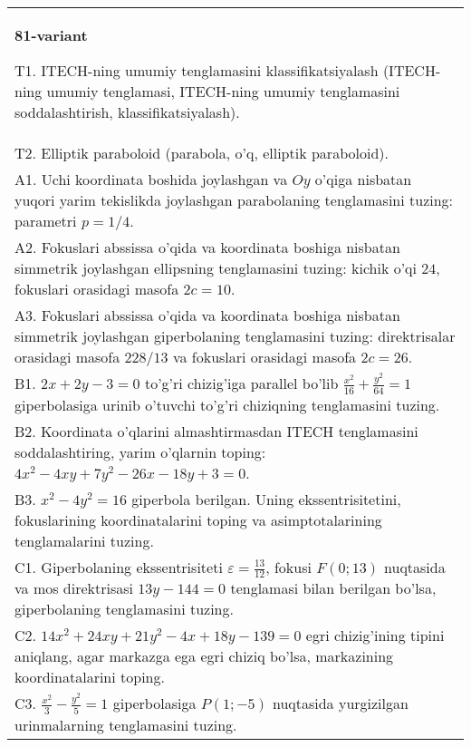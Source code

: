 \documentclass{article}
\begin{document}
\begin{tabular}{m{17cm}}
\textbf{81-variant}
\newline

T1. ITECH-ning umumiy tenglamasini klassifikatsiyalash (ITECH-ning umumiy tenglamasi, ITECH-ning umumiy tenglamasini soddalashtirish, klassifikatsiyalash).\\

T2. Elliptik paraboloid (parabola, o'q, elliptik paraboloid).\\

A1. Uchi koordinata boshida joylashgan va $Oy$ o'qiga nisbatan yuqori yarim tekislikda joylashgan parabolaning tenglamasini tuzing: parametri $p=1/4$.\\

A2. Fokuslari abssissa o'qida va koordinata boshiga nisbatan simmetrik joylashgan ellipsning tenglamasini tuzing: kichik o'qi $24$, fokuslari orasidagi masofa $2c=10$.\\

A3. Fokuslari abssissa o'qida va koordinata boshiga nisbatan simmetrik joylashgan giperbolaning tenglamasini tuzing: direktrisalar orasidagi masofa $228/13$ va fokuslari orasidagi masofa $2c=26$.\\

B1. $2x + 2y - 3 = 0$ to'g'ri chizig'iga parallel bo'lib $\frac{x^{2}}{16} + \frac{y^{2}}{64} = 1$ giperbolasiga urinib o'tuvchi to'g'ri chiziqning tenglamasini tuzing.  \\

B2. Koordinata o'qlarini almashtirmasdan ITECH tenglamasini soddalashtiring, yarim o'qlarnin toping: $4x^{2} - 4xy + 7y^{2} - 26x - 18y + 3 = 0$.\\

B3. $x^{2} - 4y^{2} = 16$ giperbola berilgan. Uning ekssentrisitetini, fokuslarining koordinatalarini toping va asimptotalarining tenglamalarini tuzing.\\

C1. Giperbolaning ekssentrisiteti $\varepsilon = \frac{13}{12}$, fokusi $F(0;13)$ nuqtasida va mos direktrisasi $13y - 144 = 0$ tenglamasi bilan berilgan bo'lsa, giperbolaning tenglamasini tuzing.  \\

C2. $14x^{2} + 24xy + 21y^{2} - 4x + 18y - 139 = 0$ egri chizig'ining tipini aniqlang, agar markazga ega egri chiziq bo'lsa, markazining koordinatalarini toping.  \\

C3. $\frac{x^{2}}{3} - \frac{y^{2}}{5} = 1$ giperbolasiga $P(1; - 5)$ nuqtasida yurgizilgan urinmalarning tenglamasini tuzing.\\

\end{tabular}
\vspace{1cm}
\end{document}

